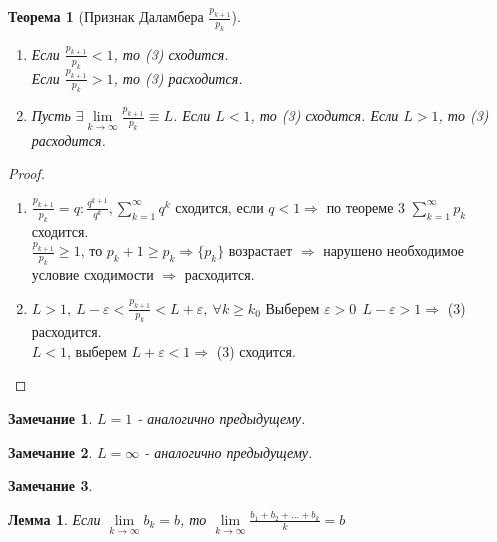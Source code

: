 \documentclass[12pt, oneside]{article}
\theoremstyle{plain}
\newtheorem{Lemma}{Лемма}
\newtheorem{Theorem}{Теорема}
\newtheorem{Note}{Замечание}
\begin{document}
	\begin{Theorem}
		[Признак Даламбера $\frac{p_{k + 1}}{p_{k}}$]\

		\begin{enumerate}
			\item Если $\frac{p_{k + 1}}{p_{k}}< 1$, то (3) сходится.\\
				Если $\frac{p_{k + 1}}{p_{k}}> 1$, то (3) расходится.

			\item Пусть $\exists \lim\limits_{k\to\infty}\frac{p_{k+1}}{p_{k}}\equiv L$.
				Если $L < 1$, то (3) сходится. Если $L > 1$, то (3) расходится.
		\end{enumerate}
	\end{Theorem}
	\begin{proof}
		\

		\begin{enumerate}
			\item $\frac{p_{k+1}}{p_{k}}= q : \frac{q^{k+1}}{q^{k}}, \sum\limits_{k =
				1}^{\infty}q^{k}$ сходится, если $q < 1 \Rightarrow$ по теореме 3
				$\sum\limits_{k = 1}^{\infty}p_{k}$ сходится.\\
				$\frac{p_{k+1}}{p_{k}}\geqslant 1$, то $p_{k}+1 \geqslant p_{k} \Rightarrow
				\{p_{k}\}$ возрастает $\Rightarrow$ нарушено необходимое условие сходимости
				$\Rightarrow$ расходится.

			\item $L > 1,\ L - \varepsilon < \frac{p_{k+1}}{p_{k}}< L + \varepsilon, \
				\forall k \geqslant k_{0}$ Выберем $\varepsilon > 0 \ \  L - \varepsilon
				> 1 \Rightarrow$ (3) расходится.\\
				$L < 1$, выберем $L + \varepsilon < 1 \Rightarrow$ (3) сходится.
		\end{enumerate}
	\end{proof}
	\begin{Note}
		$L = 1$ - аналогично предыдущему.
	\end{Note}
	\begin{Note}
		$L = \infty$ - аналогично предыдущему.
	\end{Note}
	\begin{Note}
	\end{Note}
	\begin{Lemma}
		Если $\lim\limits_{k\to\infty}b_{k} = b$, то
		$\lim\limits_{k\to\infty}\frac{b_{1} + b_{2} + ... + b_{k}}{k}= b$
	\end{Lemma}
\end{document}
